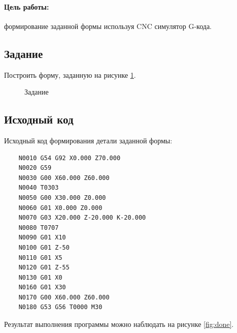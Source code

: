 \paragraph{Цель работы:} формирование заданной формы используя CNC симулятор G-кода.

\subsection*{Задание}

Построить форму, заданную на рисунке \ref{fig:task}.

\begin{figure}[ht]
    \centering
    \caption{Задание\label{fig:task}}
\end{figure}

\subsection*{Исходный код}

Исходный код формирования детали заданной формы:

\begin{verbatim}
    N0010 G54 G92 X0.000 Z70.000
    N0020 G59
    N0030 G00 X60.000 Z60.000
    N0040 T0303
    N0050 G00 X30.000 Z0.000
    N0060 G01 X0.000 Z0.000
    N0070 G03 X20.000 Z-20.000 K-20.000
    N0080 T0707
    N0090 G01 X10
    N0100 G01 Z-50
    N0110 G01 X5
    N0120 G01 Z-55
    N0130 G01 X0
    N0160 G01 X30
    N0170 G00 X60.000 Z60.000
    N0180 G53 G56 T0000 M30
\end{verbatim}

Результат выполнения программы можно наблюдать на рисунке \ref{fig:done}.

